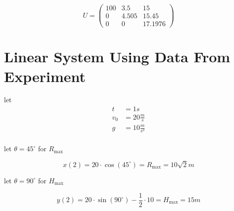\begin{equation}
    U = \begin{pmatrix}
        100 & 3.5 & 15 \\
        0 & 4.505 & 15.45 \\
        0 & 0 & 17.1976
    \end{pmatrix}
\end{equation}

\section{Linear System Using Data From Experiment}

let
\begin{align*}
    t &= 1s \\
    v_0 &= 20 \frac{m}{s} \\
    g &= 10 \frac{m}{s^2} \\
\end{align*}

\noindent let $\theta = 45^{\circ}$ for $R_{\max}$

\begin{equation}
    x(2) = 20 \cdot \cos(45^{\circ}) = R_{\max} = 10 \sqrt{2} m
\end{equation}

\noindent let $\theta = 90^{\circ}$ for $H_{\max}$

\begin{equation}
    y(2) = 20 \cdot \sin(90^{\circ}) - \frac{1}{2} \cdot 10 = H_{\max} = 15 m
\end{equation}

\newpage
\thispagestyle{plain}

